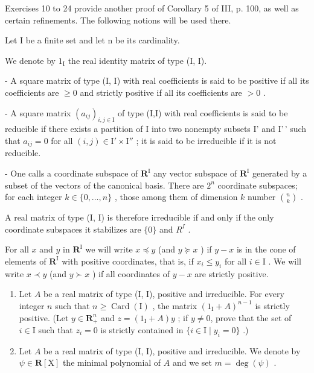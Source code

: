 Exercises 10 to 24 provide another proof of Corollary 5 of III, p. 100, as well as certain refinements. The following notions will be used there.

Let I be a finite set and let n be its cardinality.

We denote by \(1_{\mathrm{I}}\) the real identity matrix of type (I, I).

- A square matrix of type (I, I) with real coefficients is said to be positive if all its coefficients are \(\geqslant 0\) and strictly positive if all its coefficients are \(>0\) .

- A square matrix \((a_{ij})_{i,j\in \mathrm{I}}\) of type (I,I) with real coefficients is said to be reducible if there exists a partition of I into two nonempty subsets I' and I'\,' such that \(a_{ij} = 0\) for all \((i,j)\in \mathrm{I}'\times \mathrm{I}''\) ; it is said to be irreducible if it is not reducible.

- One calls a coordinate subspace of \(\mathbf{R}^{\mathrm{I}}\) any vector subspace of \(\mathbf{R}^{\mathrm{I}}\) generated by a subset of the vectors of the canonical basis. There are \(2^{n}\) coordinate subspaces; for each integer \(k\in\{0,\ldots,n\}\) , those among them of dimension \(k\) number \(\binom{n}{k}\) .

A real matrix of type (I, I) is therefore irreducible if and only if the only coordinate subspaces it stabilizes are \(\{0\}\) and \(R^{I}\) .

For all \(x\) and \(y\) in \(\mathbf{R}^{\mathrm{I}}\) we will write \(x \preccurlyeq y\) (and \(y \succcurlyeq x\) ) if \(y - x\) is in the cone of elements of \(\mathbf{R}^{\mathrm{I}}\) with positive coordinates, that is, if \(x_i \leqslant y_i\) for all \(i \in \mathrm{I}\) . We will write \(x \prec y\) (and \(y \succ x\) ) if all coordinates of \(y - x\) are strictly positive.

\begin{enumerate}
\def\labelenumi{\arabic{enumi})}
\setcounter{enumi}{9}
\item
  Let \(A\) be a real matrix of type (I, I), positive and irreducible. For every integer \(n\) such that \(n \geqslant \operatorname{Card}(\mathrm{I})\) , the matrix \((1_{\mathrm{I}} + A)^{n-1}\) is strictly positive. (Let \(y \in \mathbf{R}_{+}^{n}\) and \(z = (1_{\mathrm{I}} + A)y\) ; if \(y \neq 0\), prove that the set of \(i \in \mathrm{I}\) such that \(z_{i} = 0\) is strictly contained in \(\{i \in \mathrm{I} \mid y_{i} = 0\}\) .)
\item
  Let \(A\) be a real matrix of type (I, I), positive and irreducible. We denote by \(\psi \in \mathbf{R}[\mathrm{X}]\) the minimal polynomial of \(A\) and we set \(m = \deg(\psi)\) .
\end{enumerate}

